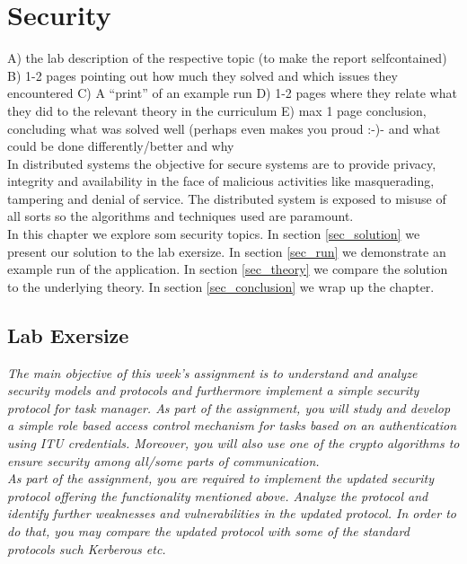 \chapter{Security}
\minitoc

A) the lab description of the respective topic (to make the report selfcontained)
B) 1-2 pages pointing out how much they solved and which issues they encountered
C) A “print” of an example run
D) 1-2 pages where they relate what they did to the relevant theory in the curriculum
E) max 1 page conclusion, concluding what was solved well (perhaps even makes you proud :-)- and what could be done differently/better and why\\



In distributed systems the objective for secure systems are to provide privacy, integrity and availability in the face of malicious activities like 
masquerading, tampering and denial of service. The distributed system is exposed to misuse of all sorts so the algorithms and techniques used are paramount. \\

In this chapter we explore som security topics. In section \ref{sec_solution} we present our solution to the lab exersize. In section \ref{sec_run} we demonstrate an example run of the application. In section \ref{sec_theory} we compare the solution to the underlying theory. In section \ref{sec_conclusion} we wrap up the chapter.  


\section{Lab Exersize}
\label{sec_exersize}

\textit{The main objective of this week’s assignment is to understand and analyze security models and protocols and furthermore implement a simple security protocol for task manager. As part of the assignment, you will study and develop a simple role based access control mechanism for tasks based on an authentication using ITU credentials. Moreover, you will also use one of the crypto algorithms to ensure security among all/some parts of communication.}\\


\textit{As part of the assignment, you are required to implement the updated security protocol offering the functionality mentioned above.
Analyze the protocol and identify further weaknesses and  vulnerabilities in the updated protocol. In order to do that, you may compare the updated protocol with some of the standard protocols such Kerberous etc.}

